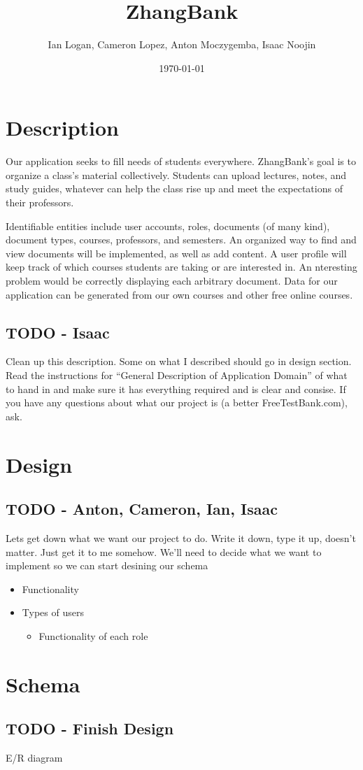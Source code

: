 \documentclass[11pt]{article}
\title{ZhangBank}
\author{Ian Logan, Cameron Lopez, Anton Moczygemba, Isaac Noojin}
\date{\today}
\begin{document}
\maketitle


\section*{Description}
\label{sec-1}


  Our application seeks to fill needs of students
  everywhere. ZhangBank's goal is to organize a class's material
  collectively. Students can upload lectures, notes, and study guides,
  whatever can help the class rise up and meet the expectations of
  their professors.

  Identifiable entities include user accounts, roles, documents (of
  many kind), document types, courses, professors, and semesters. An
  organized way to find and view documents will be implemented, as
  well as add content. A user profile will keep track of which courses
  students are taking or are interested in. An nteresting problem
  would be correctly displaying each arbitrary document. Data for our
  application can be generated from our own courses and other free
  online courses.
  
\subsection*{\textbf{TODO} - Isaac}
\label{sec-1-1}

   Clean up this description. Some on what I described should go in
   design section. Read the instructions for ``General Description of
   Application Domain'' of what to hand in and make sure it has
   everything required and is clear and consise. If you have any
   questions about what our project is (a better FreeTestBank.com),
   ask.
\section*{Design}
\label{sec-2}
\subsection*{\textbf{TODO} - Anton, Cameron, Ian, Isaac}
\label{sec-2-1}

   Lets get down what we want our project to do. Write it down, type
   it up, doesn't matter. Just get it to me somehow. We'll need to
   decide what we want to implement so we can start desining our
   schema

\begin{itemize}
\item Functionality
\item Types of users
\begin{itemize}
\item Functionality of each role
\end{itemize}
\end{itemize}
\section*{Schema}
\label{sec-3}
\subsection*{\textbf{TODO} - Finish Design}
\label{sec-3-1}

   E/R diagram
\end{document}
